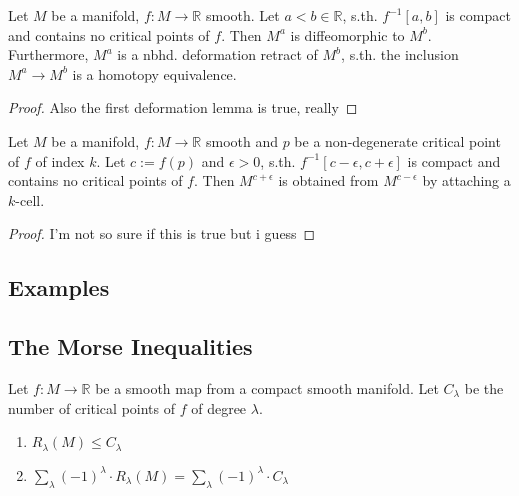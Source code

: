 \documentclass[a4paper,11pt]{article}
\begin{document}
\begin{theorem}
   \label{theorem:1st deformation lemma}
   Let $M$ be a manifold, $f: M \rightarrow \mathbb{R}$ smooth. Let $a < b \in \mathbb{R}$, s.th. 
   $f^{-1}[a, b]$ is compact and contains no critical points of $f$. Then $M^a$ is diffeomorphic
   to $M^b$. \\ 
   Furthermore, $M^a$ is a nbhd. deformation retract of $M^b$, s.th. the inclusion
   $M^a \rightarrow M^b$ is a homotopy equivalence.
\end{theorem}

\begin{proof}
   Also the first deformation lemma is true, really
\end{proof}

\begin{theorem}
   \label{theorem:2nd deformation lemma}
   Let $M$ be a manifold, $f: M \rightarrow \mathbb{R}$ smooth and $p$ be a non-degenerate critical point
   of $f$ of index $k$. Let $c := f(p)$ and $\epsilon > 0$, s.th. $f^{-1}[c-\epsilon, c+\epsilon]$
   is compact and contains no critical points of $f$. Then $M^{c+\epsilon}$ is obtained from $M^{c-\epsilon}$
   by attaching a $k$-cell.
\end{theorem}

\begin{proof}
   I'm not so sure if this is true but i guess
\end{proof}

\subsection{Examples}

\subsection{The Morse Inequalities}

\begin{lemma}
   \label{lemma:weak morse inequalities}
   Let $f: M \rightarrow \mathbb{R}$ be a smooth map from a compact smooth manifold. Let $C_{\lambda}$
   be the number of critical points of $f$ of degree $\lambda$.
   \begin{enumerate}
      \item $R_{\lambda} (M) \leq C_{\lambda}$
      \item $\sum_{\lambda} (-1)^{\lambda} \cdot R_{\lambda}(M) = \sum_{\lambda} (-1)^{\lambda} \cdot C_{\lambda} $
   \end{enumerate}
\end{lemma}
\end{document}
